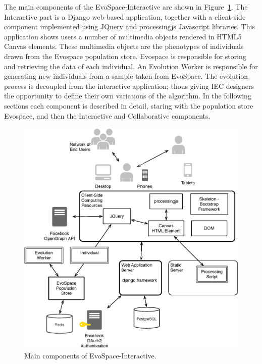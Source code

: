 \documentclass{sig-alternate}
\begin{document}
The main components of the EvoSpace-Interactive are shown in Figure~\ref{fig:arch}. The Interactive part is a Django \cite{} web-based application, together with a client-side component implemented using JQuery and processingjs Javascript libraries. This application shows users a number of multimedia objects rendered in HTML5 Canvas elements. These multimedia objects are the phenotypes of individuals drawn from the Evospace population store. Evospace is responsible for storing and retrieving the data of each individual. An Evolution Worker is responsible for generating new individuals from a sample taken from EvoSpace. The evolution process is decoupled from the interactive application; thous giving IEC designers the opportunity to define their own variations of the algorithm. In the following sections each component is described in detail, staring with the population store Evospace, and then the Interactive and Collaborative components.

\begin{figure}[!t]
    \centering
        \includegraphics[width=4.5in]{Architecture.eps}
    \caption{Main components of EvoSpace-Interactive.}
    \label{fig:arch}
\end{figure}
\end{document}

